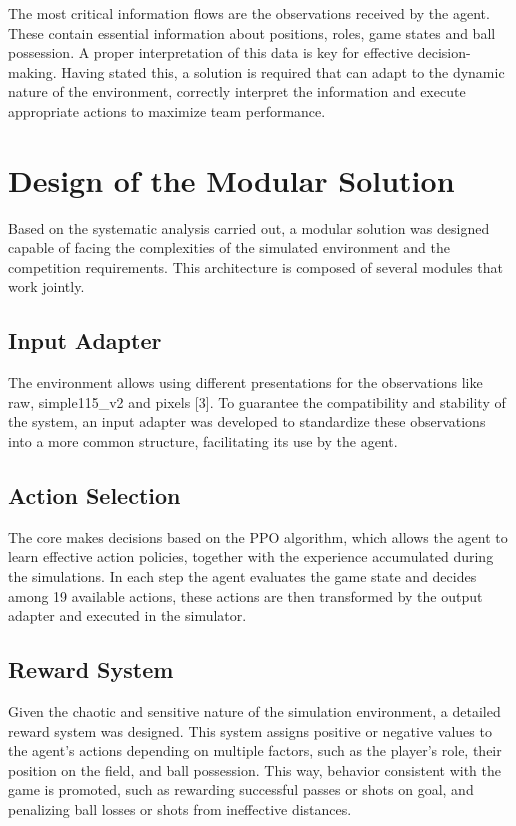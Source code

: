 \documentclass[conference]{IEEEtran}
\begin{document}
The most critical information flows are the observations received by the agent. These contain essential information about positions, roles, game states and ball possession. A proper interpretation of this data is key for effective decision-making. Having stated this, a solution is required that can adapt to the dynamic nature of the environment, correctly interpret the information and execute appropriate actions to maximize team performance.

\section{Design of the Modular Solution}
Based on the systematic analysis carried out, a modular solution was designed capable of facing the complexities of the simulated environment and the competition requirements. This architecture is composed of several modules that work jointly.

\subsection{Input Adapter}
The environment allows using different presentations for the observations like raw, simple115\_v2 and pixels [3]. To guarantee the compatibility and stability of the system, an input adapter was developed to standardize these observations into a more common structure, facilitating its use by the agent.

\subsection{Action Selection}
The core makes decisions based on the PPO algorithm, which allows the agent to learn effective action policies, together with the experience accumulated during the simulations. In each step the agent evaluates the game state and decides among 19 available actions, these actions are then transformed by the output adapter and executed in the simulator.

\subsection{Reward System}
Given the chaotic and sensitive nature of the simulation environment, a detailed reward system was designed. This system assigns positive or negative values to the agent's actions depending on multiple factors, such as the player's role, their position on the field, and ball possession. This way, behavior consistent with the game is promoted, such as rewarding successful passes or shots on goal, and penalizing ball losses or shots from ineffective distances.
\end{document}

